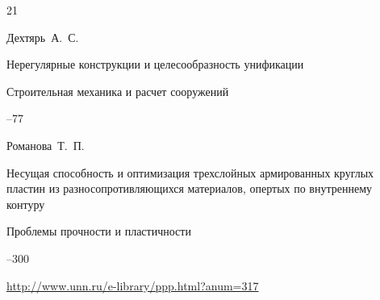 \begin{thebibliography}{21}

\by Дехтярь~А.~С.

\paper Нерегулярные конструкции и целесообразность унификации

\jour Строительная механика и расчет сооружений



--77




















\by Романова~Т.~П.

\paper Несущая способность и оптимизация трехслойных армированных круглых пластин из разносопротивляющихся материалов, опертых по внутреннему контуру

\jour Проблемы прочности и пластичности



--300

\elink \url{http://www.unn.ru/e-library/ppp.html?anum=317}




\end{thebibliography}
